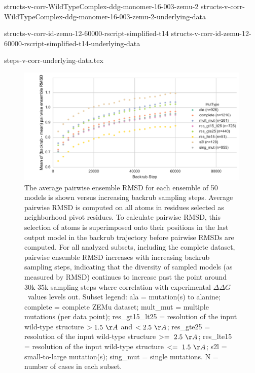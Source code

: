 \documentclass[journal=jpcbfk,manuscript=suppinfo]{achemso}
\newcommand\ddg{$\Delta\Delta G$}
\begin{document}
{structs-v-corr-WildTypeComplex-ddg-monomer-16-003-zemu-2}
\clearpage
  {\small
    {structs-v-corr-WildTypeComplex-ddg-monomer-16-003-zemu-2-underlying-data}
  }
\clearpage

{structs-v-corr-id-zemu-12-60000-rscript-simplified-t14}
\clearpage
  {\small
    {structs-v-corr-id-zemu-12-60000-rscript-simplified-t14-underlying-data}
  }
\clearpage

{\small
  {steps-v-corr-underlying-data.tex}
}

\begin{figure}
  \centering
  \includegraphics[width=\textwidth,keepaspectratio]{figures/t14-mean-ensemble-error.pdf}
  \caption{
    The average pairwise ensemble RMSD for each ensemble of 50 models is shown versus increasing backrub sampling steps.
    Average pairwise RMSD is computed on all atoms in residues selected as neighborhood pivot residues.
    To calculate pairwise RMSD, this selection of atoms is superimposed onto their positions in the last output model in the backrub trajectory before pairwise RMSDs are computed.
    For all analyzed subsets, including the complete dataset, pairwise ensemble RMSD increases with increasing backrub sampling steps, indicating that the diversity of sampled models (as measured by RMSD) continues to increase past the point around 30k-35k sampling steps where correlation with experimental \ddg\ values levels out. Subset legend: ala = mutation(s) to alanine; complete = complete ZEMu dataset; mult\_mut = multiple mutations (per data point); res\_gt15\_lt25 = resolution of the input wild-type structure $> 1.5\ \AA$ and $< 2.5\ \AA$; res\_gte25 = resolution of the input wild-type structure $>=\ 2.5\ \AA$; res\_lte15 = resolution of the input wild-type structure $<=\ 1.5\ \AA$; s2l = small-to-large mutation(s); sing\_mut = single mutations. N = number of cases in each subset.
  } \label{fig:t14-mean-ensemble} %
\end{figure}
\end{document}
